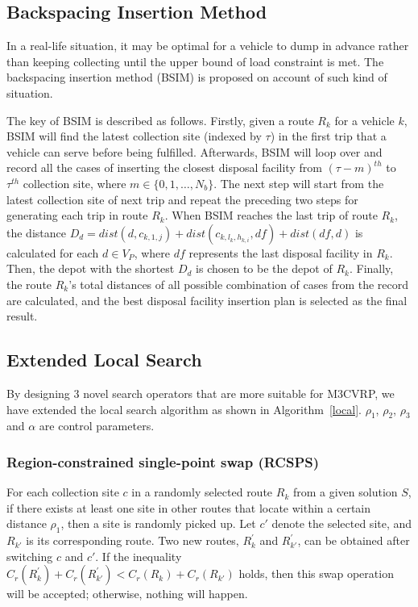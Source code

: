 \documentclass[journal]{IEEEtran}
\begin{document}
\subsection{Backspacing Insertion Method}\label{sec:bsim}

In a real-life situation, it may be optimal for a vehicle to dump in advance rather than keeping collecting until the upper bound of load constraint is met. The backspacing insertion method (BSIM) is proposed on account of such kind of situation.

The key of BSIM is described as follows. Firstly, given a route $R_k$ for a vehicle $k$, BSIM will find the latest collection site (indexed by $\tau$) in the first trip that a vehicle can serve before being fulfilled. Afterwards, BSIM will loop over and record all the cases of inserting the closest disposal facility from $(\tau-m)^{th}$ to $\tau^{th}$ collection site, where $m \in \{0, 1, \dots, N_{b}\}$. The next step will start from the latest collection site of next trip and repeat the preceding two steps for generating each trip in route $R_k$. When BSIM reaches the last trip of route $R_k$, the distance $D_{d} = dist({d, c_{k,1,j}})+dist({c_{k,l_k, h_{k,i}}, df})+dist({df, d})$ is calculated for each $d \in V_P$, where $df$ represents the last disposal facility in $R_k$. Then, the depot with the shortest $D_{d}$ is chosen to be the depot of $R_k$. Finally, the route $R_k$'s total distances of all possible combination of cases from the record are calculated, and the best disposal facility insertion plan is selected as the final result.

\subsection{Extended Local Search}\label{sec:els}
By designing 3 novel search operators that are more suitable for M3CVRP, we have extended the local search algorithm as shown in Algorithm~\ref{local}. $\rho_1$, $\rho_2$, $\rho_3$ and $\alpha$ are control parameters.

\subsubsection{Region-constrained single-point swap (RCSPS)}
For each collection site $c$ in a randomly selected route $R_k$ from a given solution $S$, if there exists at least one site in other routes that locate within a certain distance $\rho_1$, then a site is randomly picked up. Let $c'$ denote the selected site, and $R_{k'}$ is its corresponding route. Two new routes, $R_k^{'}$ and $R_{k'}^{'}$, can be obtained after switching $c$ and $c'$. If the inequality $C_r(R_k^{'})+C_r(R_{k'}^{'})<C_r(R_k)+C_r(R_{k'})$ 
holds, then this swap operation will be accepted; otherwise, nothing will happen.
\end{document}
